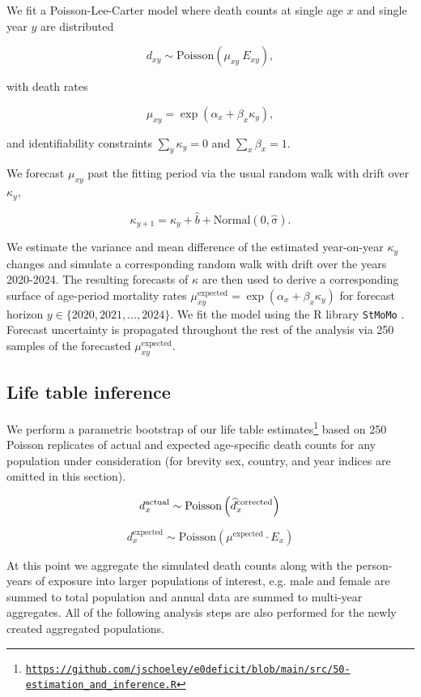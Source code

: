 \documentclass[12pt]{article}
\begin{document}
We fit a Poisson-Lee-Carter model \citep{Lee1992} where death counts at single age $x$ and single year $y$ are distributed

$$
d_{xy} \sim \mathrm{Poisson}(\mu_{xy}~E_{xy}),
$$

with death rates

$$
\mu_{xy}=\exp(\alpha_x + \beta_x\kappa_y),
$$

and identifiability constraints $\sum_y \kappa_y=0$ and $\sum_x \beta_x = 1$.

We forecast $\mu_{xy}$ past the fitting period via the usual random walk with drift over $\kappa_y$,

$$
\kappa_{y+1} = \kappa_y + \widehat{b} + \mathrm{Normal(0, \widehat{\sigma})}.
$$

We estimate the variance and mean difference of the estimated year-on-year $\kappa_y$ changes and simulate a corresponding random walk with drift over the years 2020-2024. The resulting forecasts of $\kappa$ are then used to derive a corresponding surface of age-period mortality rates $\mu^\mathrm{expected}_{xy}=\exp\left(\alpha_x + \beta_x\kappa_y\right)$ for forecast horizon $y \in \{2020, 2021, \ldots, 2024\}$. We fit the model using the R library \texttt{StMoMo} \citep{Villegas2015}. Forecast uncertainty is propagated throughout the rest of the analysis via 250 samples of the forecasted $\mu^\mathrm{expected}_{xy}$.

\subsection{Life table inference}

We perform a parametric bootstrap of our life table estimates\footnote{\href{https://github.com/jschoeley/e0deficit/blob/main/src/50-estimation_and_inference.R}{\texttt{https://github.com/jschoeley/e0deficit/blob/main/src/50-estimation\_and\_inference.R}}} based on 250 Poisson replicates of actual and expected age-specific death counts for any population under consideration (for brevity sex, country, and year indices are omitted in this section).

$$
  d_{x}^\mathrm{actual} \sim \mathrm{Poisson}\left( \widehat{d}_{x}^\mathrm{corrected} \right) \\
$$

$$
  d_{x}^\mathrm{expected} \sim \mathrm{Poisson}\left( \mu^\mathrm{expected}\cdot E_{x} \right)
$$

At this point we aggregate the simulated death counts along with the person-years of exposure into larger populations of interest, e.g. male and female are summed to total population and annual data are summed to multi-year aggregates. All of the following analysis steps are also performed for the newly created aggregated populations.
\end{document}
